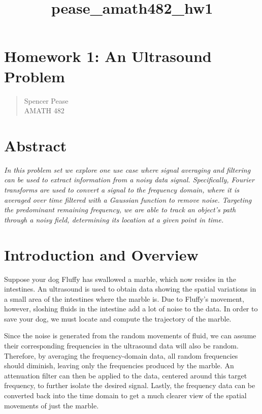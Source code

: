 \documentclass[11pt]{article}
\title{pease\_amath482\_hw1}
\begin{document}
    
    
    \maketitle
    
    

    
    \hypertarget{homework-1-an-ultrasound-problem}{%
\section{Homework 1: An Ultrasound
Problem}\label{homework-1-an-ultrasound-problem}}

\begin{quote}
Spencer Pease\\
AMATH 482
\end{quote}

\hypertarget{abstract}{%
\section{Abstract}\label{abstract}}

\emph{In this problem set we explore one use case where signal averaging
and filtering can be used to extract information from a noisy data
signal. Specifically, Fourier transforms are used to convert a signal to
the frequency domain, where it is averaged over time filtered with a
Gaussian function to remove noise. Targeting the predominant remaining
frequency, we are able to track an object's path through a noisy field,
determining its location at a given point in time.}

    \hypertarget{introduction-and-overview}{%
\section{Introduction and Overview}\label{introduction-and-overview}}

Suppose your dog Fluffy has swallowed a marble, which now resides in the
intestines. An ultrasound is used to obtain data showing the spatial
variations in a small area of the intestines where the marble is. Due to
Fluffy's movement, however, sloshing fluids in the intestine add a lot
of noise to the data. In order to save your dog, we must locate and
compute the trajectory of the marble.

Since the noise is generated from the random movements of fluid, we can
assume their corresponding frequencies in the ultrasound data will also
be random. Therefore, by averaging the frequency-domain data, all random
frequencies should diminish, leaving only the frequencies produced by
the marble. An attenuation filter can then be applied to the data,
centered around this target frequency, to further isolate the desired
signal. Lastly, the frequency data can be converted back into the time
domain to get a much clearer view of the spatial movements of just the
marble.
\end{document}

